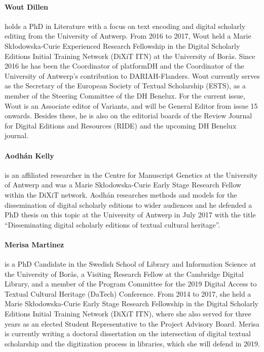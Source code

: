 \paragraph{Wout Dillen} holds a PhD in Literature with a focus on text encoding and digital scholarly editing from the University of Antwerp. From 2016 to 2017, Wout held a Marie Skłodowska-Curie Experienced Research Fellowship in the Digital Scholarly Editions Initial Training Network (DiXiT ITN) at the University of Borås. Since 2016 he has been the Coordinator of platform{DH} and the Coordinator of the University of Antwerp’s contribution to DARIAH-Flanders. Wout currently serves as the Secretary of the European Society of Textual Scholarship (ESTS), as a member of the Steering Committee of the DH Benelux. For the current issue, Wout is an Associate editor of Variants, and will be General Editor from issue 15 onwards. Besides these, he is also on the editorial boards of the Review Journal for Digital Editions and Resources (RIDE) and the upcoming DH Benelux journal.

\paragraph{Aodhán Kelly} is an affiliated researcher in the Centre for Manuscript Genetics at the University of Antwerp and was a Marie Skłodowska-Curie Early Stage Research Fellow within the DiXiT network. Aodhán researches methods and models for the dissemination of digital scholarly editions to wider audiences and he defended a PhD thesis on this topic at the University of Antwerp in July 2017 with the title ``Disseminating digital scholarly editions of textual cultural heritage''.

\paragraph{Merisa Martinez} is a PhD Candidate in the Swedish School of Library and Information Science at the University of Borås, a Visiting Research Fellow at the Cambridge Digital Library, and a member of the Program Committee for the 2019 Digital Access to Textual Cultural Heritage (DaTech) Conference. From 2014 to 2017, she held a Marie Skłodowska-Curie Early Stage Research Fellowship in the Digital Scholarly Editions Initial Training Network (DiXiT ITN), where she also served for three years as an elected Student Representative to the Project Advisory Board. Merisa is currently writing a doctoral dissertation on the intersection of digital textual scholarship and the digitization process in libraries, which she will defend in 2019.

